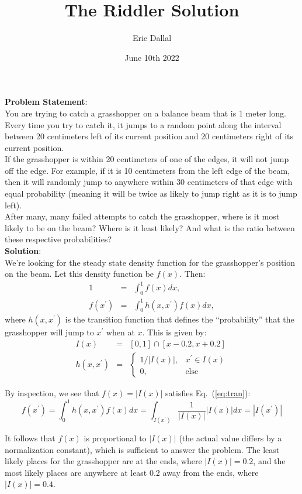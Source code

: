 \documentclass[10pt,a4paper]{article}
\title{The Riddler Solution}
\date{June 10th 2022}
\author{Eric Dallal}
\begin{document}
\maketitle
\textbf{Problem Statement}:\\

You are trying to catch a grasshopper on a balance beam that is 1 meter long. Every time you try to catch it, it jumps to a random point along the interval between 20 centimeters left of its current position and 20 centimeters right of its current position.\\

If the grasshopper is within 20 centimeters of one of the edges, it will not jump off the edge. For example, if it is 10 centimeters from the left edge of the beam, then it will randomly jump to anywhere within 30 centimeters of that edge with equal probability (meaning it will be twice as likely to jump right as it is to jump left).\\

After many, many failed attempts to catch the grasshopper, where is it most likely to be on the beam? Where is it least likely? And what is the ratio between these respective probabilities?\\

\textbf{Solution}:\\

We're looking for the steady state density function for the grasshopper's position on the beam. Let this density function be $f(x)$. Then:
\begin{eqnarray}
1 & =  & \int_{0}^{1}f(x)dx, \label{eq:pdf}\\
f(x^{\prime}) & = & \int_{0}^{1}h(x, x^{\prime})f(x)dx, \label{eq:tran}
\end{eqnarray}
where $h(x, x^{\prime})$ is the transition function that defines the ``probability'' that the grasshopper will jump to $x^{\prime}$ when at $x$. This is given by:
\begin{eqnarray}
I(x) & = & [0, 1] \cap [x - 0.2, x + 0.2]\\
h(x, x^{\prime}) & = & \left\{\begin{array}{ll}
1/|I(x)|, & x^{\prime} \in I(x)\\
0, & \mbox{else}
\end{array}\right.
\end{eqnarray}

By inspection, we see that $f(x) = |I(x)|$ satisfies Eq.~(\ref{eq:tran}):
\begin{equation}
f(x^{\prime}) = \int_{0}^{1}h(x, x^{\prime})f(x)dx = \int_{I(x^{\prime})}^{}\frac{1}{|I(x)|}|I(x)|dx = |I(x^{\prime})|
\end{equation}

It follows that $f(x)$ is proportional to $|I(x)|$ (the actual value differs by a normalization constant), which is sufficient to answer the problem. The least likely places for the grasshopper are at the ends, where $|I(x)| = 0.2$, and the most likely places are anywhere at least 0.2 away from the ends, where $|I(x)| = 0.4$.
\end{document}
